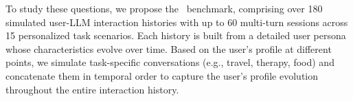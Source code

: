 
To study these questions, we propose the \datasetnameemoji~benchmark, comprising over 180 simulated user-LLM interaction histories with up to 60 multi-turn sessions across 15 personalized task scenarios. Each history is built from a detailed user persona whose characteristics evolve over time. Based on the user's profile at different points, we simulate task-specific conversations (e.g., travel, therapy, food) and concatenate them in temporal order to capture the user’s profile evolution throughout the entire interaction history.






